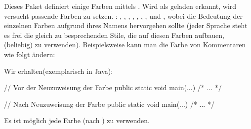 \documentclass{sopra-base}
\begin{document}
    Dieses Paket definiert einige Farben mittels . Wird  als geladen erkannt, wird versucht passende Farben zu setzen. : , , , , , , ,  und , wobei die Bedeutung der einzelnen Farben aufgrund ihres Namens hervorgehen sollte (jeder Sprache steht es frei die gleich zu besprechenden Stile, die
    auf diesen Farben aufbauen, (beliebig) zu verwenden). Beispielsweise kann man die Farbe
    von Kommentaren wie folgt ändern:
\begin{plainlatex}
\end{plainlatex}
    Wir erhalten(exemplarisch in Java):
    \bgroup
\begin{java}
// Vor der Neuzuweisung der Farbe
public static void main(...){ /* ... */ }
\end{java}
    \begin{java}
// Nach Neuzuweisung der Farbe
public static void main(...){ /* ... */ }
    \end{java}
    \egroup
 Es ist möglich jede Farbe (nach ) zu verwenden.
\end{document}
